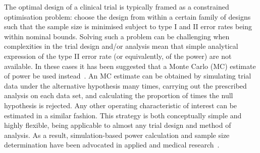 \documentclass{article} %
\begin{document}

The optimal design of a clinical trial is typically framed as a constrained optimisation problem: choose the design from within a certain family of designs such that the sample size is minimised subject to type I and II error rates being within nominal bounds. Solving such a problem can be challenging when complexities in the trial design and/or analysis mean that simple analytical expression of the type II error rate (or equivalently, of the power) are not available. In these cases it has been suggested that a Monte Carlo (MC) estimate of power be used instead~\cite{Landau2013}. An MC estimate can be obtained by simulating trial data under the alternative hypothesis many times, carrying out the prescribed analysis on each data set, and calculating the proportion of times the null hypothesis is rejected. Any other operating characteristic of interest can be estimated in a similar fashion.  This strategy is both conceptually simple and highly flexible, being applicable to almost any trial design and method of analysis. As a result, simulation-based power calculation and sample size determination have been advocated in applied and medical research~\cite{Arnold2011, Landau2013}.
\end{document}
